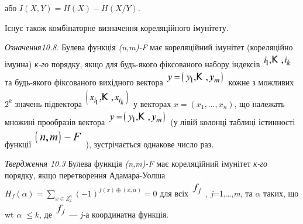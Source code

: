 {\centering
або   ${I(X,Y)=H(X)-H(X/Y)}$.
\par}

Існує також комбінаторне визначення кореляційного імунітету.

\textit{Означення10.8.}\textit{ }Булева функція
\textit{(}\textit{n}\textit{,}\textit{m}\textit{)-}\textit{F}  має кореляційний
імунітет (кореляційно імунна) \textit{к-го }порядку, якщо для будь-якого
фіксованого набору індексів 
\includegraphics[width=0.528in,height=0.25in]{crypt-img/crypt-img216.png}  та
будь-якого фіксованого вихідного вектора 
\includegraphics[width=1.0693in,height=0.278in]{crypt-img/crypt-img217.png} 
кожне з можливих  ${2^{{k}}}$ значень підвектора 
\includegraphics[width=0.8193in,height=0.3335in]{crypt-img/crypt-img218.png}  у
векторах  ${x=(x_{{1}},\dots,x_{{n}})}$, що належать множині
прообразів вектора 
\includegraphics[width=1.0693in,height=0.278in]{crypt-img/crypt-img219.png}  
(у лівій колонці таблиці істинності функції 
\includegraphics[width=0.8744in,height=0.3425in]{crypt-img/crypt-img220.png} ),
зустрічається однакове число раз.

\textit{Твердження 10.3}\textit{ }Булева функція
\textit{(}\textit{n}\textit{,}\textit{m}\textit{)-}\textit{F}  має кореляційний
імунітет \textit{к-го }порядку, якщо перетворення Адамара-Уолша 
${H_{{f}}(\alpha )=\underset{{x\in Z_{{2}}^{{n}}}}{\sum
}{(-1)^{{f(x){\oplus}(x,\alpha )}}}=0}$ для всіх 
\includegraphics[width=0.2083in,height=0.278in]{crypt-img/crypt-img221.png} ,
\textit{j}=1,…,\textit{m}, та   ${\alpha }$\textit{ }\textit{ }таких, що wt
${\alpha \;\le k}$, де 
\includegraphics[width=0.2083in,height=0.278in]{crypt-img/crypt-img222.png}  ---
\textit{j-}а \textit{ }координатна функція.


